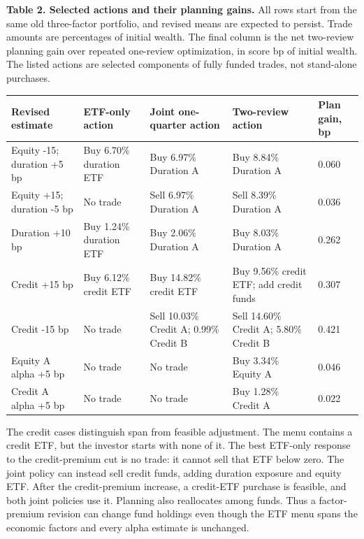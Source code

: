 \documentclass[11pt]{article}
\begin{document}
\begin{table}[!htbp]
\centering
\parbox{\linewidth}{\label{tab:2}
\textbf{Table 2. Selected actions and their planning gains.} All rows start from the same old three-factor portfolio, and revised means are expected to persist. Trade amounts are percentages of initial wealth. The final column is the net two-review planning gain over repeated one-review optimization, in score bp of initial wealth. The listed actions are selected components of fully funded trades, not stand-alone purchases.}
\par\smallskip
{\footnotesize\setlength{\tabcolsep}{4pt}
\begin{tabular}{P{85pt}P{72pt}P{118pt}P{125pt}P{27pt}}
\toprule
\textbf{Revised estimate} & \textbf{ETF-only action} & \textbf{Joint one-quarter action} & \textbf{Two-review action} & \textbf{Plan gain, bp} \\
\midrule
Equity -15; duration +5 bp & Buy 6.70\% duration ETF & Buy 6.97\% Duration A & Buy 8.84\% Duration A & 0.060 \\
Equity +15; duration -5 bp & No trade & Sell 6.97\% Duration A & Sell 8.39\% Duration A & 0.036 \\
Duration +10 bp & Buy 1.24\% duration ETF & Buy 2.06\% Duration A & Buy 8.03\% Duration A & 0.262 \\
Credit +15 bp & Buy 6.12\% credit ETF & Buy 14.82\% credit ETF & Buy 9.56\% credit ETF; add credit funds & 0.307 \\
Credit -15 bp & No trade & Sell 10.03\% Credit A; 0.99\% Credit B & Sell 14.60\% Credit A; 5.80\% Credit B & 0.421 \\
Equity A alpha +5 bp & No trade & No trade & Buy 3.34\% Equity A & 0.046 \\
Credit A alpha +5 bp & No trade & No trade & Buy 1.28\% Credit A & 0.022 \\
\bottomrule
\end{tabular}}
\end{table}

The credit cases distinguish span from feasible adjustment. The menu contains a credit ETF, but the investor starts with none of it. The best ETF-only response to the credit-premium cut is no trade: it cannot sell that ETF below zero. The joint policy can instead sell credit funds, adding duration exposure and equity ETF. After the credit-premium increase, a credit-ETF purchase is feasible, and both joint policies use it. Planning also reallocates among funds. Thus a factor-premium revision can change fund holdings even though the ETF menu spans the economic factors and every alpha estimate is unchanged.
\end{document}
